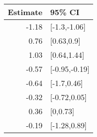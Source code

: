 \begin{tabular}{rl}
  \hline
Estimate & 95\% CI \\ 
  \hline
-1.18 & [-1.3,-1.06] \\ 
  0.76 & [0.63,0.9] \\ 
  1.03 & [0.64,1.44] \\ 
  -0.57 & [-0.95,-0.19] \\ 
  -0.64 & [-1.7,0.46] \\ 
  -0.32 & [-0.72,0.05] \\ 
  0.36 & [0,0.73] \\ 
  -0.19 & [-1.28,0.89] \\ 
   \hline
\end{tabular}

